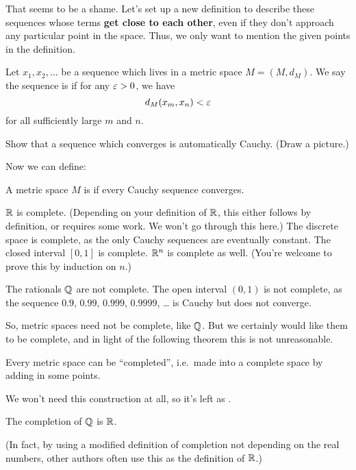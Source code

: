 That seems to be a shame.
Let's set up a new definition to describe these sequences whose terms
\textbf{get close to each other},
even if they don't approach any particular point in the space.
Thus, we only want to mention the given points in the definition.

\begin{definition}
	Let $x_1, x_2, \dots$ be a sequence which lives in a metric space $M = (M,d_M)$.
	We say the sequence is  if for any $\varepsilon > 0$, we have
	\[ d_M(x_m, x_n) < \varepsilon \]
	for all sufficiently large $m$ and $n$.
\end{definition}

\begin{ques}
	Show that a sequence which converges is automatically Cauchy.
	(Draw a picture.)
\end{ques}

Now we can define:
\begin{definition}
	A metric space $M$ is  if every
	Cauchy sequence converges.
\end{definition}

\begin{example}
	\listhack
	\begin{enumerate}[(a)]
		\ii $\RR$ is complete.
		(Depending on your definition of $\RR$,
		this either follows by definition, or requires some work.
		We won't go through this here.)
		\ii The discrete space is complete,
		as the only Cauchy sequences are eventually constant.
		\ii The closed interval $[0,1]$ is complete.
		\ii $\mathbb R^n$ is complete as well.
		(You're welcome to prove this by induction on $n$.)
	\end{enumerate}
\end{example}

\begin{example}
	\listhack
	\begin{enumerate}[(a)]
		\ii The rationals $\QQ$ are not complete.
		\ii The open interval $(0,1)$ is not complete,
		as the sequence $0.9$, $0.99$, $0.999$, $0.9999$, \dots
		is Cauchy but does not converge.
	\end{enumerate}
\end{example}

So, metric spaces need not be complete, like $\QQ$.
But we certainly would like them to be complete,
and in light of the following theorem this is not unreasonable.
\begin{theorem}
	[Completion]
	Every metric space can be ``completed'',
	i.e.\ made into a complete space by adding in some points.
\end{theorem}
We won't need this construction at all,
so it's left as .
\begin{example}
	[$\QQ$ completes to $\RR$]
	The completion of $\QQ$ is $\RR$.
\end{example}
(In fact, by using a modified definition of completion
not depending on the real numbers,
other authors often use this as the definition of $\RR$.)

